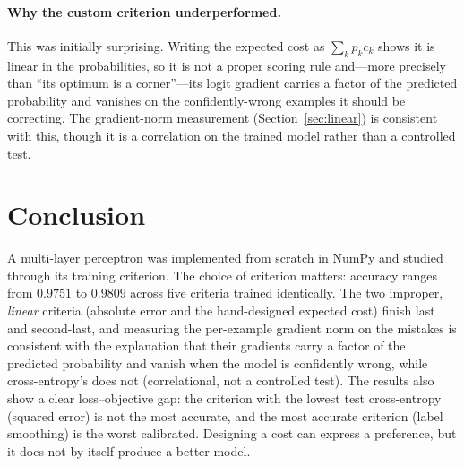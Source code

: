 \documentclass[11pt]{article}
\begin{document}
\paragraph{Why the custom criterion underperformed.} This was initially surprising. Writing the
expected cost as $\sum_k\hat p_k c_k$ shows it is linear in the probabilities, so it is not a
proper scoring rule and---more precisely than ``its optimum is a corner''---its logit gradient
carries a factor of the predicted probability and vanishes on the confidently-wrong examples it
should be correcting. The gradient-norm measurement (Section~\ref{sec:linear}) is consistent with
this, though it is a correlation on the trained model rather than a controlled test.

\section{Conclusion}

A multi-layer perceptron was implemented from scratch in NumPy and studied through its training
criterion. The choice of criterion matters: accuracy ranges from $0.9751$ to $0.9809$ across
five criteria trained identically. The two improper, \emph{linear} criteria (absolute error and
the hand-designed expected cost) finish last and second-last, and measuring the per-example
gradient norm on the mistakes is consistent with the explanation that their gradients carry a
factor of the predicted probability and vanish when the model is confidently wrong, while
cross-entropy's does not (correlational, not a controlled test). The
results also show a clear loss--objective gap: the criterion with the lowest test cross-entropy
(squared error) is not the most accurate, and the most accurate criterion (label smoothing) is
the worst calibrated. Designing a cost can express a preference, but it does not by itself
produce a better model.

\printbibliography
\end{document}
